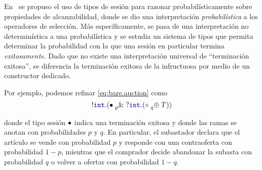 En~\cite{DBLP:conf/concur/InversoMPTT20} se propuso el uso de tipos de sesión
para razonar probabilísticamente sobre propiedades de alcanzabilidad, donde se
dio una interpretación \emph{probabilística} a los operadores de selección. Más
específicamente, se pasa de una interpretación no determinística a una
probabilística y se estudia un sistema de tipos que permita determinar la
probabilidad con la que una sesión en particular termina \emph{exitosamente}.
Dado que no existe una interpretación universal de ``terminación exitosa'', se
diferencia la terminación exitosa de la infructuosa por medio de un constructor
dedicado.

Por ejemplo, podemos refinar \eqref{eq:bare.auction} como
\begin{equation}
    \label{eq:refined.auction}
    \cout\tint\parens{
        \tbranch[p]\tdone{
            \cin\tint\parens{
                \tchoice[q]\tend\T
            }
        }
    }
\end{equation}

donde el tipo sesión ${\bullet}$ indica una terminación exitosa y donde las
ramas  se anotan con probabilidades $p$ y $q$. En particular, el subastador
declara que el artículo se vende con probabilidad $p$ y  responde con una
contraoferta con probabilidad $1-p$, mientras que el comprador decide abandonar
la subasta con probabilidad $q$ o volver a ofertar con probabilidad $1-q$.
